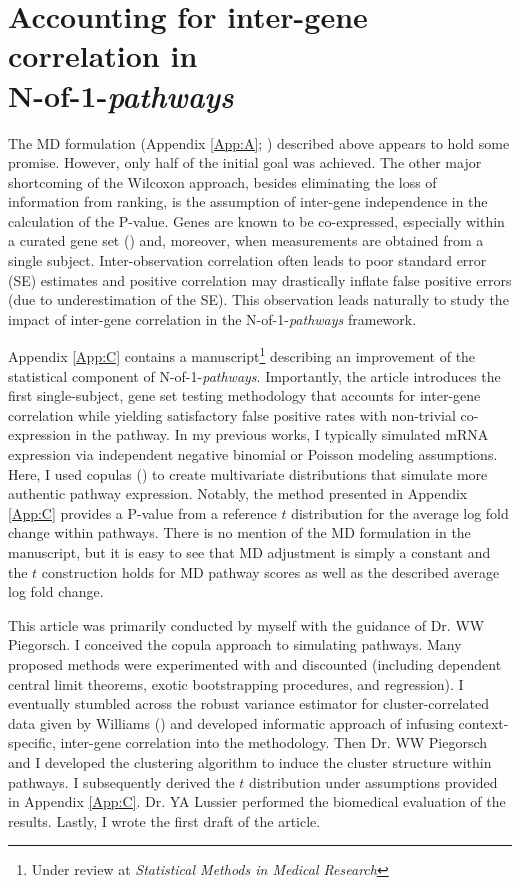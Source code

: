 \chapter{Accounting for inter-gene correlation in\\N-of-1-\emph{pathways}} \label{Chap:ct}

\indent \indent The MD formulation (Appendix \ref{App:A}; \cite{Schissler2015}) described above appears to hold some promise. However, only half of the initial goal was achieved. The other major shortcoming of the Wilcoxon approach, besides eliminating the loss of information from ranking, is the assumption of inter-gene independence in the calculation of the P-value. Genes are known to be co-expressed, especially within a curated gene set (\cite{Tamayo2016}) and, moreover, when measurements are obtained from a single subject. Inter-observation correlation often leads to poor standard error (SE) estimates and positive correlation may drastically inflate false positive errors (due to underestimation of the SE). This observation leads naturally to study the impact of inter-gene correlation in the N-of-1-\emph{pathways} framework.

Appendix \ref{App:C} contains a manuscript\footnote{Under review at \emph{Statistical Methods in Medical Research}} describing an improvement of the statistical component of N-of-1-\emph{pathways}. Importantly, the article introduces the first single-subject, gene set testing methodology that accounts for inter-gene correlation while yielding satisfactory false positive rates with non-trivial co-expression in the pathway. In my previous works, I typically simulated mRNA expression via independent negative binomial or Poisson modeling assumptions. Here, I used copulas (\cite{Genest2007,Yan2007}) to create multivariate distributions that simulate more authentic pathway expression. Notably, the method presented in Appendix \ref{App:C} provides a P-value from a reference $t$ distribution for the average log fold change within pathways. There is no mention of the MD formulation in the manuscript, but it is easy to see that MD adjustment is simply a constant and the $t$ construction holds for MD pathway scores as well as the described average log fold change.

This article was primarily conducted by myself with the guidance of Dr. WW Piegorsch. I conceived the copula approach to simulating pathways. Many proposed methods were experimented with and discounted (including dependent central limit theorems, exotic bootstrapping procedures, and regression). I eventually stumbled across the robust variance estimator for cluster-correlated data given by Williams (\cite{Williams2000}) and developed informatic approach of infusing context-specific, inter-gene correlation into the methodology. Then Dr. WW Piegorsch and I developed the clustering algorithm to induce the cluster structure within pathways. I subsequently derived the $t$ distribution under assumptions provided in Appendix \ref{App:C}. Dr. YA Lussier performed the biomedical evaluation of the results. Lastly, I wrote the first draft of the article.
